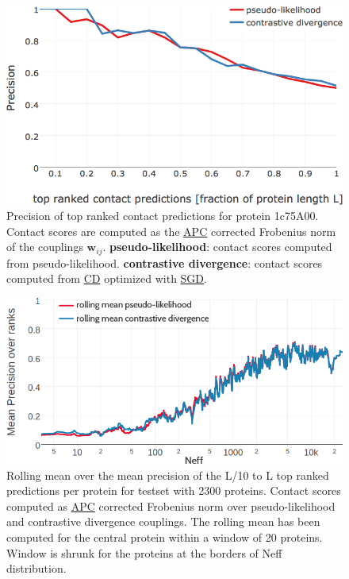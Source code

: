 \documentclass[11pt,a4paper,twoside]{book}
\newcommand{\wij}{\mathbf{w}_{ij}}
\theoremstyle{definition}
\theoremstyle{definition}
\theoremstyle{remark}
\begin{document}
\begin{figure}

{\centering \includegraphics[width=0.9\linewidth]{img/full_likelihood/comparing_couplings/1c75A00/1c75A00_precision_vs_rank_8seqsep_8contacthr} 

}

\caption{Precision of top ranked contact
predictions for protein 1c75A00. Contact scores are computed as the
\protect\hyperlink{abbrev}{APC} corrected Frobenius norm of the
couplings \(\wij\). \textbf{pseudo-likelihood}: contact scores computed
from pseudo-likelihood. \textbf{contrastive divergence}: contact scores
computed from \protect\hyperlink{abbrev}{CD} optimized with
\protect\hyperlink{abbrev}{SGD}.}\label{fig:precision-pll-cd-1c75a00}
\end{figure}










\begin{figure}

{\centering \includegraphics[width=0.9\linewidth]{img/full_likelihood/final/meanprecision_by_neff} 

}

\caption{Rolling mean over the mean
precision of the L/10 to L top ranked predictions per protein for
testset with 2300 proteins. Contact scores computed as
\protect\hyperlink{abbrev}{APC} corrected Frobenius norm over
pseudo-likelihood and contrastive divergence couplings. The rolling mean
has been computed for the central protein within a window of 20
proteins. Window is shrunk for the proteins at the borders of Neff
distribution.}\label{fig:precision-cd-final-neff}
\end{figure}
\end{document}
